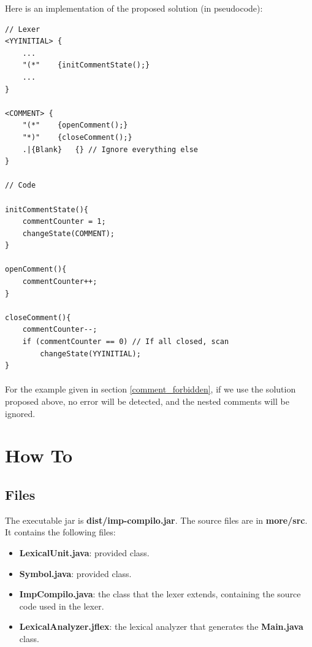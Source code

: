 \documentclass[letterpaper]{article}
\begin{document}
Here is an implementation of the proposed solution (in pseudocode): \\
\begin{lstlisting}[frame=single]
// Lexer
<YYINITIAL> {
    ...
    "(*"    {initCommentState();}
    ...
}

<COMMENT> {
    "(*"    {openComment();}
    "*)"    {closeComment();}
    .|{Blank}   {} // Ignore everything else
}

// Code

initCommentState(){
    commentCounter = 1;
    changeState(COMMENT);
}

openComment(){
    commentCounter++;
}

closeComment(){
    commentCounter--;
    if (commentCounter == 0) // If all closed, scan
        changeState(YYINITIAL);
}

\end{lstlisting}

\paragraph{}

For the example given in section \ref{comment_forbidden}, if we use the
solution proposed above, no error will be detected, and the nested
comments will be ignored.

\section{How To}

\subsection{Files}

The executable jar is \textbf{dist/imp-compilo.jar}.
The source files are in \textbf{more/src}. It contains the following files:

\begin{itemize}
    \item \textbf{LexicalUnit.java}: provided class.
    \item \textbf{Symbol.java}: provided class.
    \item \textbf{ImpCompilo.java}:
    the class that the lexer extends, containing the
    source code used in the lexer.
    \item \textbf{LexicalAnalyzer.jflex}:
    the lexical analyzer that generates the
    \textbf{Main.java} class.
\end{itemize}
\end{document}
